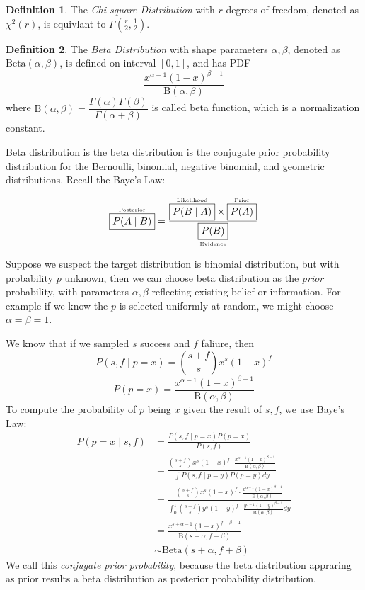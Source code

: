 \documentclass[12pt,a4paper,twoside]{article}
\theoremstyle{definition}
\newtheorem{definition}{Definition}[section]
\theoremstyle{remark}
\begin{document}
    \begin{definition}
        The \textit{Chi-square Distribution} with $r$ degrees of freedom, denoted as $\chi^2(r)$, is equivlant to $\Gamma(\frac r 2, \frac 1 2)$.
    \end{definition}
    \begin{definition}
        The \textit{Beta Distribution} with shape parameters $\alpha, \beta$, denoted as $\text{Beta}(\alpha, \beta)$, is defined on interval $[0, 1]$, and has PDF 
        \[ \frac{x^{\alpha - 1}(1 - x)^{\beta - 1}}{\text{B}(\alpha, \beta)} \]
        where $\text{B}(\alpha, \beta) = \dfrac{\Gamma(\alpha)\Gamma(\beta)}{\Gamma(\alpha + \beta)}$ is called beta function, which is a normalization constant.
    \end{definition}
    Beta distribution is the beta distribution is the conjugate prior probability distribution for the Bernoulli, binomial, negative binomial, and geometric distributions. Recall the Baye's Law:

    \[ \overset{\text{\tiny Posterior}}{\boxed{P(A \mid B)}} = \frac {\overset{\text{\tiny Likelihood}}{\boxed{P(B \mid A)}} \times \overset{\text{\tiny Prior}}{\boxed{P(A)}}}{\underset{\text{\tiny Evidence}}{\boxed{P(B)}}} \]

    Suppose we suspect the target distribution is binomial distribution, but with probability $p$ unknown, 
    then we can choose beta distribution as the \textit{prior} probability, with parameters $\alpha, \beta$ reflecting existing belief or information. 
    For example if we know the $p$ is selected uniformly at random, we might choose $\alpha = \beta = 1$.

    We know that if we sampled $s$ success and $f$ faliure, then
    \[ P(s, f \mid p = x) = \binom{s+f}{s}x^s(1-x)^f \]
    \[ P(p = x) = \frac{x^{\alpha - 1}(1 - x)^{\beta - 1}}{\text{B}(\alpha, \beta)} \]
    To compute the probability of $p$ being $x$ given the result of $s, f$, we use Baye's Law:
    \begin{align*}
        P(p = x \mid s, f) 
        & = \frac{P(s, f \mid p = x)P(p = x)}{P(s, f)} \\
        & = \frac{\binom{s+f}{s}x^s(1-x)^f \cdot \frac{x^{\alpha - 1}(1 - x)^{\beta - 1}}{\text{B}(\alpha, \beta)}}
                 {\int P(s, f \mid p = y)P(p = y) dy} \\
        & = \frac{\binom{s+f}{s}x^s(1-x)^f \cdot \frac{x^{\alpha - 1}(1 - x)^{\beta - 1}}{\text{B}(\alpha, \beta)}}
                 {\int_0^1 \binom{s+f}{s}y^s(1-y)^f \cdot \frac{y^{\alpha - 1}(1 - y)^{\beta - 1}}{\text{B}(\alpha, \beta)} dy} \\
        & = \frac{x^{s+\alpha-1}(1-x)^{f+\beta-1}}{\text{B}(s + \alpha, f + \beta)} \\
        & \sim \text{Beta}(s + \alpha, f + \beta)
    \end{align*}
    We call this \textit{conjugate prior probability}, because the beta distribution appraring as prior results a beta distribution as posterior probability distribution. 
\end{document}
